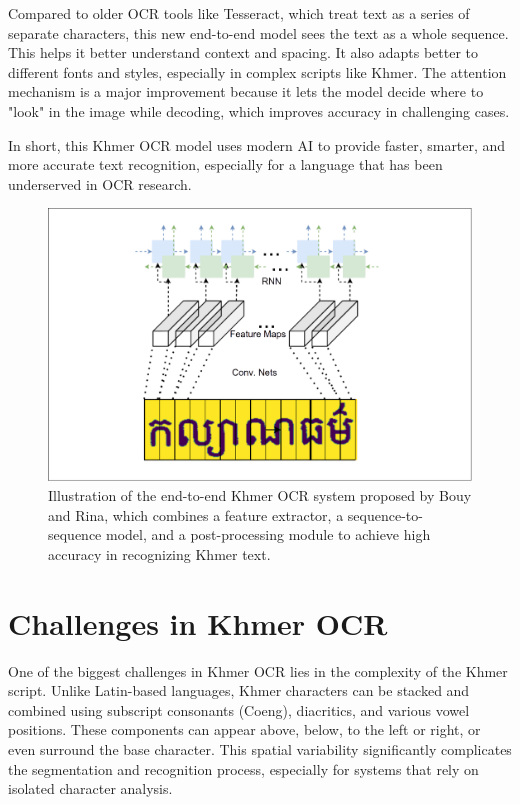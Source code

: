 Compared to older OCR tools like Tesseract, which treat text as a series of separate 
characters, this new end-to-end model sees the text as a whole sequence. 
This helps it better understand context and spacing. It also adapts better 
to different fonts and styles, especially in complex scripts like Khmer. 
The attention mechanism is a major improvement because it lets the model decide 
where to "look" in the image while decoding, which improves accuracy in challenging cases.

In short, this Khmer OCR model uses modern AI to provide faster, smarter, and 
more accurate text recognition, especially for a language that has been 
underserved in OCR research.

\begin{figure}[ht]
    \centering
    \includegraphics[width=\textwidth]{figures/bouy_rina_end_to_end_khmer_ocr.png}
    \caption{Illustration of the end-to-end Khmer OCR system proposed by Bouy and Rina,
    which combines a feature extractor, a sequence-to-sequence model,
     and a post-processing module to achieve high accuracy in recognizing Khmer text. \cite{buoy2021seq2seq}}
    \label{fig:bouy-rina-end-to-end-khmer-ocr}
\end{figure}


\section{Challenges in Khmer OCR}
\label{sec:datasets}

One of the biggest challenges in Khmer OCR lies in the complexity of the Khmer script. 
Unlike Latin-based languages,  Khmer characters can be stacked and combined using 
subscript consonants (Coeng), \cite{buoy2021seq2seq} diacritics, and various vowel positions. These components 
can appear above, below, to the left or right, or even surround the base character. 
This spatial variability significantly complicates the segmentation and recognition 
process, especially for systems that rely on isolated character analysis.

